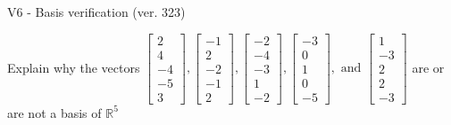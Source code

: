 \begin{exercise}
  \begin{exerciseTitle}V6 - Basis verification (ver. 323)\end{exerciseTitle}
  \begin{exerciseStatement}
    Explain why the vectors \(\left[\begin{array}{r}
2 \\
4 \\
-4 \\
-5 \\
3
\end{array}\right] , \left[\begin{array}{r}
-1 \\
2 \\
-2 \\
-1 \\
2
\end{array}\right] , \left[\begin{array}{r}
-2 \\
-4 \\
-3 \\
1 \\
-2
\end{array}\right] , \left[\begin{array}{r}
-3 \\
0 \\
1 \\
0 \\
-5
\end{array}\right] , \text{ and } \left[\begin{array}{r}
1 \\
-3 \\
2 \\
2 \\
-3
\end{array}\right]\) are or are not a basis of \(\mathbb{R}^5\)	



\end{exerciseStatement}
\end{exercise}
